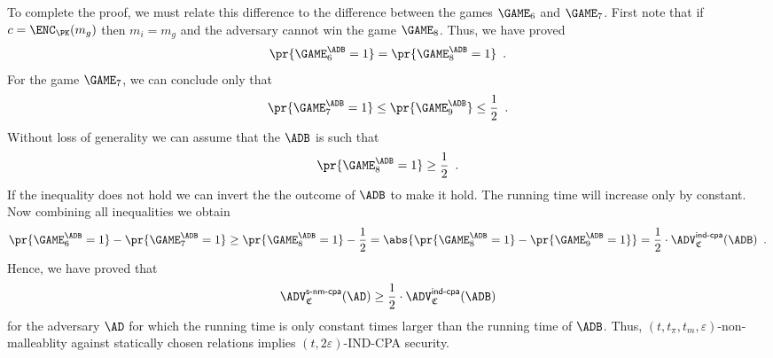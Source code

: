 \documentclass{crypto-exercise}
\newcommand{\ADVINDCPA}[2]{\ADV^{\mathsf{ind\text{-}cpa}}_{#1}{(#2)}}
\newcommand{\ADVNMCPA}[2]{\ADV^{\mathsf{s\text{-}nm\text{-}cpa}}_{#1}{(#2)}}
\newcommand{\CS}{\mathfrak{C}}
\theoremstyle{plain}\newtheorem{stmt}{Statement}
\begin{document}
\begin{solution}
To complete the proof, we must relate this difference to the difference between the games $\GAME_6$ and $\GAME_7$. First note that if $c=\ENC_\PK(m_g)$ then $m_i=m_g$ and the adversary cannot win the game $\GAME_8$. Thus, we have proved
\begin{align*}
\pr{\GAME_6^\ADB=1}=\pr{\GAME_8^\ADB=1}\enspace.
\end{align*}
For the game $\GAME_7$, we can conclude only that
\begin{align*}
\pr{\GAME_7^\ADB=1}\leq\pr{\GAME_9^\ADB}\leq \frac{1}{2}\enspace.
\end{align*}
Without loss of generality we can assume that the $\ADB$ is such that
\begin{align*}
\pr{\GAME_8^\ADB=1}\geq \frac{1}{2}\enspace.
\end{align*}
If the inequality does not hold we can invert the the outcome of $\ADB$ to make it hold. The running time will increase only by constant. Now combining all inequalities we obtain 
\begin{align*}
\pr{\GAME_6^\ADB=1}-\pr{\GAME_7^\ADB=1}\geq \pr{\GAME_8^\ADB=1}-\frac{1}{2}= \abs{\pr{\GAME_8^\ADB=1}-\pr{\GAME_9^\ADB=1}}=\frac{1}{2}\cdot\ADVINDCPA{\CS}{\ADB}\enspace.
\end{align*} 
Hence, we have proved that 
\begin{align*}
\ADVNMCPA{\CS}{\AD}\geq\frac{1}{2}\cdot\ADVINDCPA{\CS}{\ADB}
\end{align*}
for the adversary $\AD$ for which the running time is only constant times larger than the running time of $\ADB$. Thus, $(t,t_\pi,t_m,\varepsilon)$-non-malleablity against statically chosen relations implies $(t,2\varepsilon)$-IND-CPA security.

\end{solution}
\end{document}
